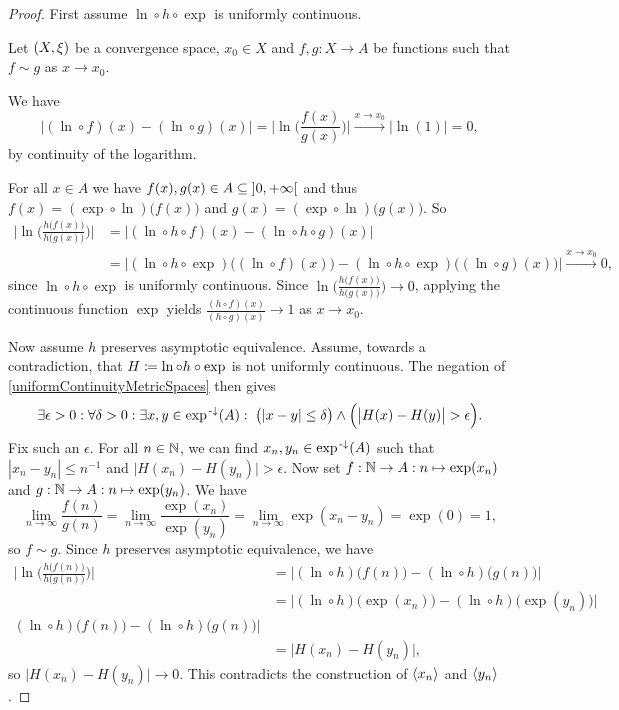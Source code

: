 \begin{proof}
First assume $\ln\circ h\circ \exp$ is uniformly continuous.

Let $\sSet{X,\xi}$ be a convergence space, $x_0\in X$ and $f,g: X\to A$ be functions such that $f\sim g$ as $x\to x_0$.

We have
\[ \big|(\ln \circ f)(x) - (\ln \circ g)(x)\big| = \Big|\ln\Big(\frac{f(x)}{g(x)}\Big)\Big| \overset{x\to x_0}{\longrightarrow} |\ln(1)| = 0, \]
by continuity of the logarithm.

For all $x\in A$ we have $f(x), g(x)\in A \subseteq \interval[o]{0,+\infty}$ and thus $f(x) = (\exp\circ \ln)\big(f(x)\big)$ and $g(x) = (\exp\circ \ln)\big(g(x)\big)$. So
\begin{align*}
\Big|\ln\Big(\frac{h\big(f(x)\big)}{h\big(g(x)\big)}\Big)\Big| &= \big|(\ln\circ h \circ f)(x) - (\ln\circ h \circ g)(x)\big| \\
&= \big|(\ln\circ h \circ \exp)\big((\ln\circ f)(x)\big) - (\ln\circ h \circ \exp)\big((\ln\circ g)(x)\big)\big| \overset{x\to x_0}{\longrightarrow} 0,
\end{align*}
since $\ln\circ h \circ \exp$ is uniformly continuous. Since $\ln\Big(\frac{h\big(f(x)\big)}{h\big(g(x)\big)}\Big) \to 0$, applying the continuous function $\exp$ yields $\frac{(h\circ f)(x)}{(h\circ g)(x)} \to 1$ as $x\to x_0$.

Now assume $h$ preserves asymptotic equivalence. Assume, towards a contradiction, that $H \coloneqq \ln\circ h\circ \exp$ is not uniformly continuous. The negation of \ref{uniformContinuityMetricSpaces} then gives
\[ \exists \epsilon >0: \forall \delta > 0: \exists x,y\in \exp^{{\text{\hspace{0.15em}-}\downarrow}}(A): \; \big(|x-y| \leq \delta\big) \land \Big(\big|H(x) - H(y)\big| > \epsilon\Big). \]
Fix such an $\epsilon$. For all $n\in \mathbb{N}$, we can find $x_n,y_n \in \exp^{{\text{\hspace{0.15em}-}\downarrow}}(A)$ such that $|x_n - y_n| \leq n^{-1}$ and $\big|H(x_n) - H(y_n)\big| > \epsilon$. Now set $f: \mathbb{N}\to A: n\mapsto \exp(x_n)$ and $g: \mathbb{N}\to A: n\mapsto \exp(y_n)$. We have
\[ \lim_{n\to \infty} \frac{f(n)}{g(n)} = \lim_{n\to \infty} \frac{\exp(x_n)}{\exp(y_n)} = \lim_{n\to \infty}\exp(x_n - y_n) = \exp(0) = 1, \]
so $f\sim g$. Since $h$ preserves asymptotic equivalence, we have
\begin{align*}
\Big|\ln\Big(\frac{h\big(f(n))}{h\big(g(n))}\Big)\Big| &= \big|(\ln\circ h)\big(f(n)\big) - (\ln\circ h)\big(g(n)\big)\big| \\
&= \big|(\ln\circ h)\big(\exp(x_n)\big) - (\ln\circ h)\big(\exp(y_n)\big)\big| \\
(\ln\circ h)\big(f(n)\big) - (\ln\circ h)\big(g(n)\big)\big| \\
&= \big|H(x_n) - H(y_n)\big|,
\end{align*}
so $\big|H(x_n) - H(y_n)\big| \to 0$. This contradicts the construction of $\left\langle x_n \right\rangle$ and $\left\langle y_n \right\rangle$.
\end{proof}

